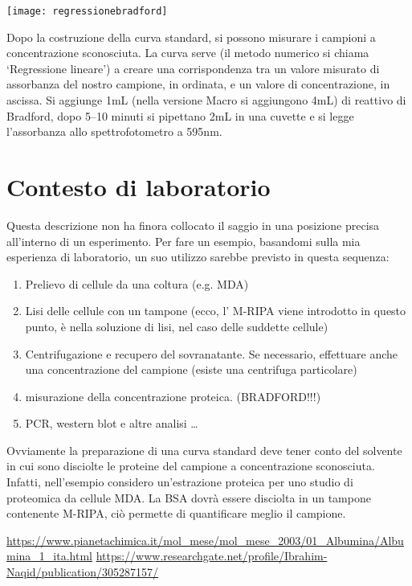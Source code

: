 \documentclass[12pt, a4paper]{article}
\begin{document}
\begin{center}
\texttt{[image: regressionebradford]}
\begin{figure}[!h] 
\cite{bsa-paper}
\end{figure}
\end{center}

Dopo la costruzione della curva standard, si possono misurare i campioni a concentrazione sconosciuta.
La curva serve (il metodo numerico si chiama `Regressione lineare')  a creare una corrispondenza tra un valore misurato di assorbanza del nostro campione, in ordinata, e un valore di concentrazione, in ascissa.
Si aggiunge 1mL (nella versione Macro si aggiungono 4mL) di reattivo di Bradford, dopo 5--10 minuti si pipettano 2mL in una cuvette e si legge l'assorbanza allo spettrofotometro a 595nm.


\section{Contesto di laboratorio}
Questa descrizione non ha finora collocato il saggio in una posizione precisa all'interno di un esperimento.
Per fare un esempio, basandomi sulla mia esperienza di laboratorio, un suo utilizzo sarebbe previsto in questa sequenza:

\begin{enumerate}
\item Prelievo di cellule da una coltura (e.g. MDA)
\item Lisi delle cellule con un tampone (ecco, l' M-RIPA viene introdotto in questo punto, è nella soluzione di lisi, nel caso delle suddette cellule)
\item Centrifugazione e recupero del sovranatante. Se necessario, effettuare anche una concentrazione del campione (esiste una centrifuga particolare)
\item misurazione della concentrazione proteica. (BRADFORD!!!)
\item PCR, western blot e altre analisi \ldots
\end{enumerate}

Ovviamente la preparazione di una curva standard deve tener conto del solvente in cui sono disciolte le proteine del campione a concentrazione sconosciuta.
Infatti, nell'esempio considero un'estrazione proteica per uno studio di proteomica da cellule MDA.
La BSA dovrà essere disciolta in un tampone contenente M-RIPA, ciò permette di quantificare meglio il campione.

\begin{thebibliography}{2}
 \url{https://www.pianetachimica.it/mol_mese/mol_mese_2003/01_Albumina/Albumina_1_ita.html}
 \url{https://www.researchgate.net/profile/Ibrahim-Naqid/publication/305287157/}
\end{thebibliography}
\end{document}
